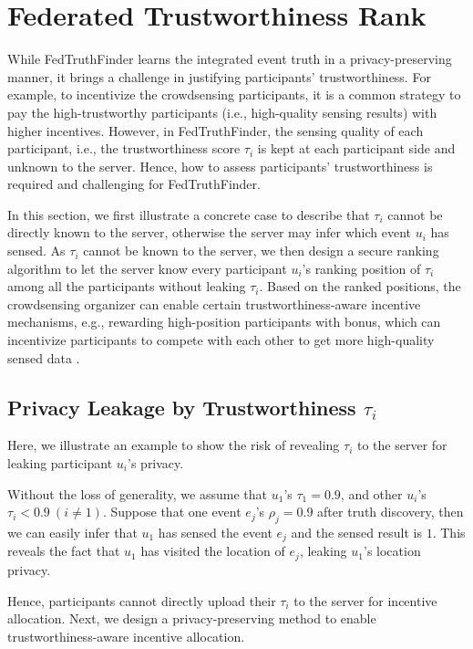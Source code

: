 \section{Federated Trustworthiness Rank}
\label{sec:trust_ranking}

While FedTruthFinder learns the integrated event truth in a privacy-preserving manner, it brings a challenge in justifying participants' trustworthiness. For example, to incentivize the crowdsensing participants, it is a common strategy to pay the high-trustworthy participants (i.e., high-quality sensing results) with higher incentives. However, in FedTruthFinder, the sensing quality of each participant, i.e., the trustworthiness score $\tau_i$ is kept at each participant side and unknown to the server. Hence, how to assess participants' trustworthiness is required and challenging for FedTruthFinder.

In this section, we first illustrate a concrete case to describe that $\tau_i$ cannot be directly known to the server, otherwise the server may infer which event $u_i$ has sensed. As $\tau_i$ cannot be known to the server, we then design a secure ranking algorithm to let the server know every participant $u_i$'s ranking position of $\tau_i$ among all the participants without leaking $\tau_i$. Based on the ranked positions, the crowdsensing organizer can enable certain trustworthiness-aware incentive mechanisms, e.g., rewarding high-position participants with bonus, which can incentivize participants to compete with each other to get more high-quality sensed data \citep{Reddy2010ExaminingMF}.

\subsection{Privacy Leakage by Trustworthiness $\tau_i$}

Here, we illustrate an example to show the risk of revealing $\tau_i$ to the server for leaking participant $u_i$'s privacy.

Without the loss of generality, we assume that $u_1$'s $\tau_1 = 0.9$, and other $u_i$'s $\tau_i < 0.9\ (i\not=1)$. Suppose that one event $e_j$'s $\rho_j = 0.9$ after truth discovery, then we can easily infer that $u_1$ has sensed the event $e_j$ and the sensed result is $1$. This reveals the fact that $u_1$ has visited the location of $e_j$, leaking $u_1$'s location privacy.

Hence, participants cannot directly upload their $\tau_i$ to the server for incentive allocation. Next, we design a privacy-preserving method to enable trustworthiness-aware incentive allocation. 

